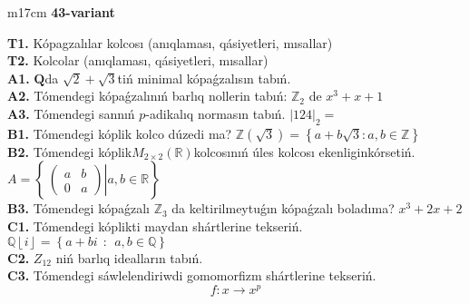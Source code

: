 \documentclass{article}
\begin{document}
\begin{tabular}{m{17cm}}
\textbf{43-variant}
\newline

\textbf{T1.} Kópagzalılar kolcosı (anıqlaması, qásiyetleri, mısallar) \\
\textbf{T2.} Kolcolar (anıqlaması, qásiyetleri, mısallar) \\
\textbf{A1.} \(\mathbf{Q}\)da \(\sqrt{2} + \sqrt{3}\)tiń minimal kópaǵzalısın tabıń. \\
\textbf{A2.} Tómendegi kópaǵzalınıń barlıq nollerin tabıń: \(\mathbb{Z}_{2}\) de \(x^{3} + x + 1\) \\
\textbf{A3.} Tómendegi sannıń \(p\)-adikalıq normasın tabıń. \(|124|_{2} =\) \\
\textbf{B1.} Tómendegi kóplik kolco dúzedi ma? \(\mathbb{Z}\left( \sqrt{3} \right) = \left\{ a + b\sqrt{3}:a,b \in \mathbb{Z} \right\}\) \\
\textbf{B2.} Tómendegi kóplik\(M_{2 \times 2}\left( \mathbb{R} \right)\)kolcosınıń úles kolcosı ekenliginkórsetiń. \(A = \left\{ \left. \ \begin{pmatrix}
a & b \\
0 & a
\end{pmatrix} \right|a,b\mathbb{\in R} \right\}\) \\
\textbf{B3.} Tómendegi kópaǵzalı \(\mathbb{Z}_{3}\) da keltirilmeytuǵın kópaǵzalı boladıma? \(x^{3} + 2x + 2\) \\
\textbf{C1.} Tómendegi kóplikti maydan shártlerine tekseriń. \(\mathbb{Q}\left\lfloor i \right\rfloor = \left\{ a + bi\ \ :\ \ a,b\mathbb{\in Q} \right\}\) \\
\textbf{C2.} \(Z_{12}\) niń barlıq idealların tabıń. \\
\textbf{C3.} Tómendegi sáwlelendiriwdi gomomorfizm shártlerine tekseriń.
\[f:x \rightarrow x^{p}\] \\

\end{tabular}
\vspace{1cm}
\end{document}

